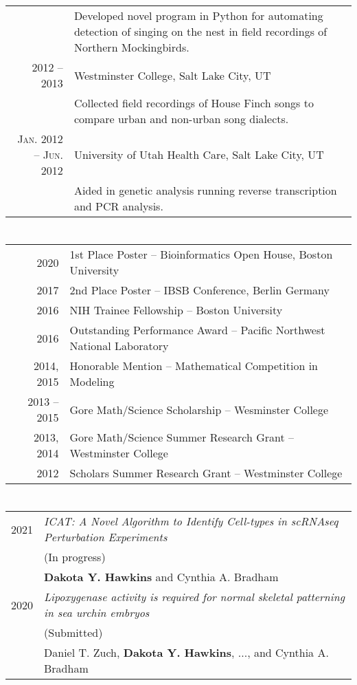 \documentclass[a4paper,10pt]{article}
\begin{document}
\begin{tabular}{rp{10cm}}
& \footnotesize{Developed novel program in Python for automating detection of
                singing on the nest in field recordings of Northern Mockingbirds.}\\
\textsc{2012 -- 2013} & Westminster College, Salt Lake City, UT\\
& \footnotesize{Collected field recordings of House Finch songs to compare urban
                and non-urban song dialects.}\\
\textsc{Jan. 2012 -- Jun. 2012} & University of Utah Health Care, Salt Lake City, UT
\\& \footnotesize{Aided in genetic analysis running reverse transcription and PCR analysis.}
\end{tabular}


\section{\color{linkcolour}{Honors and Awards}}
\begin{tabular}{rl}
2020 & 1st Place Poster -- Bioinformatics Open House, Boston University \\ 
2017 & 2nd Place Poster -- IBSB Conference, Berlin Germany \\
2016 & NIH Trainee Fellowship -- Boston University \\
2016 & Outstanding Performance Award -- Pacific Northwest National Laboratory \\
2014, 2015 & Honorable Mention -- Mathematical Competition in Modeling \\
2013 -- 2015 &  Gore Math/Science Scholarship -- Wesminster College \\
2013, 2014 & Gore Math/Science Summer Research Grant -- Westminster College \\
2012 & Scholars Summer Research Grant -- Westminster College
\end{tabular}

\section{\color{linkcolour}{Publications}}
\begin{tabular}{rp{10cm}}
	\textsc{2021} & \emph{ICAT: A Novel Algorithm to Identify Cell-types in scRNAseq Perturbation Experiments} \\
	              & (In progress) \\
				  & \small{\textbf{Dakota Y. Hawkins} and Cynthia A. Bradham} \\
	\textsc{2020} & \emph{Lipoxygenase activity is required for normal skeletal patterning in sea urchin embryos} \\
				  & (Submitted) \\
				  & \small{Daniel T. Zuch, \textbf{Dakota Y. Hawkins}, ...,
					       and Cynthia A. Bradham} \\
\end{tabular}
\end{document}

